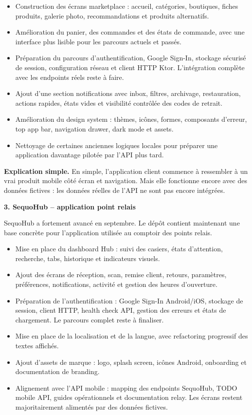 \documentclass[11pt,letterpaper]{article}
\newcommand{\subsectiontitle}[1]{%
  \vspace{0.35em}
  {\large\bfseries\color{SequoInk}#1}\par
}
\newcommand{\simpleexplanation}[1]{%
  {\small\textbf{\color{SequoBlue}Explication simple.} \color{SequoMuted}#1\par}
}
\begin{document}
\begin{itemize}
  \item Construction des écrans marketplace : accueil, catégories, boutiques, fiches produits, galerie photo, recommandations et produits alternatifs.
  \item Amélioration du panier, des commandes et des états de commande, avec une interface plus lisible pour les parcours actuels et passés.
  \item Préparation du parcours d'authentification, Google Sign-In, stockage sécurisé de session, configuration réseau et client HTTP Ktor. L'intégration complète avec les endpoints réels reste à faire.
  \item Ajout d'une section notifications avec inbox, filtres, archivage, restauration, actions rapides, états vides et visibilité contrôlée des codes de retrait.
  \item Amélioration du design system : thèmes, icônes, formes, composants d'erreur, top app bar, navigation drawer, dark mode et assets.
  \item Nettoyage de certaines anciennes logiques locales pour préparer une application davantage pilotée par l'API plus tard.
\end{itemize}

\simpleexplanation{En simple, l'application client commence à ressembler à un vrai produit mobile côté écran et navigation. Mais elle fonctionne encore avec des données fictives : les données réelles de l'API ne sont pas encore intégrées.}

\subsectiontitle{3. SequoHub -- application point relais}
SequoHub a fortement avancé en septembre. Le dépôt contient maintenant une base concrète pour l'application utilisée au comptoir des points relais.

\begin{itemize}
  \item Mise en place du dashboard Hub : suivi des casiers, états d'attention, recherche, tabs, historique et indicateurs visuels.
  \item Ajout des écrans de réception, scan, remise client, retours, paramètres, préférences, notifications, activité et gestion des heures d'ouverture.
  \item Préparation de l'authentification : Google Sign-In Android/iOS, stockage de session, client HTTP, health check API, gestion des erreurs et états de chargement. Le parcours complet reste à finaliser.
  \item Mise en place de la localisation et de la langue, avec refactoring progressif des textes affichés.
  \item Ajout d'assets de marque : logo, splash screen, icônes Android, onboarding et documentation de branding.
  \item Alignement avec l'API mobile : mapping des endpoints SequoHub, TODO mobile API, guides opérationnels et documentation relay. Les écrans restent majoritairement alimentés par des données fictives.
\end{itemize}
\end{document}
